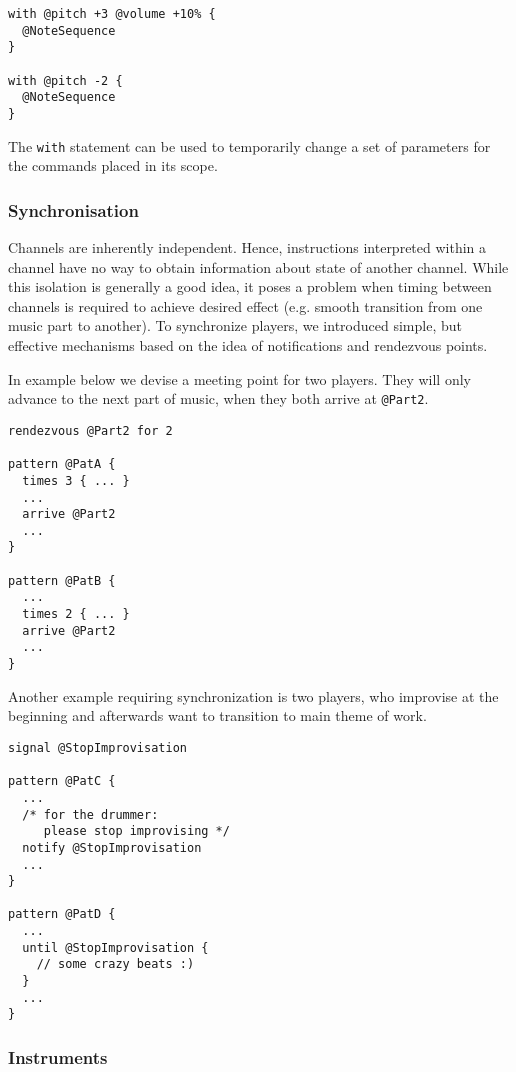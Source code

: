 \documentclass{article}
\begin{document}
\begin{lstlisting}[caption=Temporary parameters modification]
with @pitch +3 @volume +10% {
  @NoteSequence
}

with @pitch -2 {
  @NoteSequence
}
\end{lstlisting}

The {\tt with} statement can be used to temporarily change a set of parameters
for the commands placed in its scope.

\subsubsection{Synchronisation}

Channels are inherently independent. Hence, instructions interpreted within a
channel have no way to obtain information about state of another channel. While
this isolation is generally a good idea, it poses a problem when timing between
channels is required to achieve desired effect (e.g. smooth transition from one
music part to another). To synchronize players, we introduced simple, but
effective mechanisms based on the idea of notifications and rendezvous points.

In example below we devise a meeting point for two players. They will only
advance to the next part of music, when they both arrive at {\tt @Part2}.

\begin{lstlisting}[caption=Use of meeting points for synchronization]
rendezvous @Part2 for 2

pattern @PatA {
  times 3 { ... }
  ...
  arrive @Part2
  ...
}

pattern @PatB {
  ...
  times 2 { ... }
  arrive @Part2
  ...
}
\end{lstlisting}

Another example requiring synchronization is two players, who improvise at the
beginning and afterwards want to transition to main theme of work.

\begin{lstlisting}[caption=Communication through signalling]
signal @StopImprovisation

pattern @PatC {
  ...
  /* for the drummer:
     please stop improvising */
  notify @StopImprovisation
  ...
}

pattern @PatD {
  ...
  until @StopImprovisation {
    // some crazy beats :)
  }
  ...
}
\end{lstlisting}

\subsubsection{Instruments}
\end{document}
